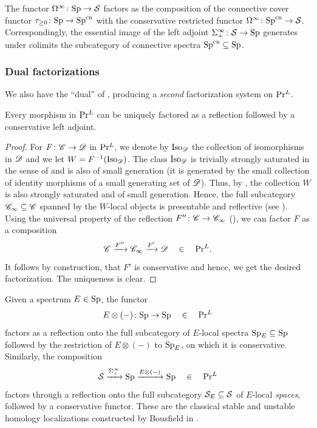 \documentclass[english]{article}
\begin{document}
\begin{example}
     The functor $\Omega^\infty\colon \mathrm{Sp} \to \mathcal{S}$ factors as the composition of the connective cover functor $\tau_{\ge0}\colon \mathrm{Sp} \to \mathrm{Sp}^{\mathrm{cn}}$ with the conservative restricted functor $\Omega^\infty\colon\mathrm{Sp}^{\mathrm{cn}} \to \mathcal{S}$. Correspondingly, the essential image of the left adjoint $\Sigma_+^\infty \colon \mathcal{S} \to \mathrm{Sp}$ generates under colimits the subcategory of connective spectra $\mathrm{Sp}^{\mathrm{cn}} \subseteq \mathrm{Sp}$. 
\end{example}

\subsubsection{Dual factorizations}

We also have the ``dual'' of , producing a \textit{second} factorization system on $\mathrm{Pr}{}^L$.
\begin{prop}\label{PrL_Factor_Sys}
    Every morphism in $\mathrm{Pr}{}^L$ can be uniquely factored as a reflection followed by a conservative left adjoint.
\end{prop}
\begin{proof}
    For $F\colon \mathscr{C} \to \mathscr{D}$ in $\mathrm{Pr}{}^L$, we denote by $\mathrm{Iso}_{\mathscr{D}}$ the collection of isomorphisms in $\mathscr{D}$ and we let $W=F^{-1}(\mathrm{Iso}_{\mathscr{D}})$. The class $\mathrm{Iso}_{\mathscr{D}}$ is trivially strongly saturated in the sense of \cite[Definition 5.5.4.5]{htt} and is also of small generation (it is generated by the small collection of identity morphisms of a small generating set of $\mathscr{D}$). Thus, by \cite[Proposition 5.5.4.16]{htt}, the collection $W$ is also strongly saturated and of small generation. Hence, the full subcategory $\mathscr{C}_\infty \subseteq \mathscr{C}$ spanned by the $W$-local objects is presentable and reflective (see \cite[Proposition 5.5.4.15]{htt}). Using the universal property of the reflection $F''\colon \mathscr{C} \to \mathscr{C}_\infty$ (\cite[Proposition 5.5.4.20]{htt}), we can factor $F$ as a composition
    \[
        \mathscr{C} \xrightarrow{F''} \mathscr{C}_\infty \xrightarrow{F'} \mathscr{D}
        \quad\in\quad \mathrm{Pr}{}^L.
    \]
    It follows by construction, that $F'$ is conservative and hence, we get the desired factorization. The uniqueness is clear. 
\end{proof}

\begin{example}\label{Ex_Homology_Loc}
    Given a spectrum $E\in \mathrm{Sp}$, the functor 
    \[
        E\otimes(-)\colon \mathrm{Sp} \to \mathrm{Sp} \quad\in\quad \mathrm{Pr}{}^L
    \]
    factors as a reflection onto the full subcategory of $E$-local spectra $\mathrm{Sp}_E\subseteq \mathrm{Sp}$ followed by the restriction of $E\otimes(-)$ to $\mathrm{Sp}_E$, on which it is conservative. Similarly, the composition
    \[
        \mathcal{S} \xrightarrow{\Sigma_+^\infty} 
        \mathrm{Sp} \xrightarrow{E\otimes(-)} 
        \mathrm{Sp}
        \quad\in\quad \mathrm{Pr}{}^L
    \]
    factors through a reflection onto the full subcategory $\mathcal{S}_E \subseteq \mathcal{S}$ of $E$-local \textit{spaces}, followed by a conservative functor. These are the classical stable and unstable homology localizations constructed by Bousfield in
    \cite{bousfield1979localization,bousfield1975localization}.
\end{example}
\end{document}
